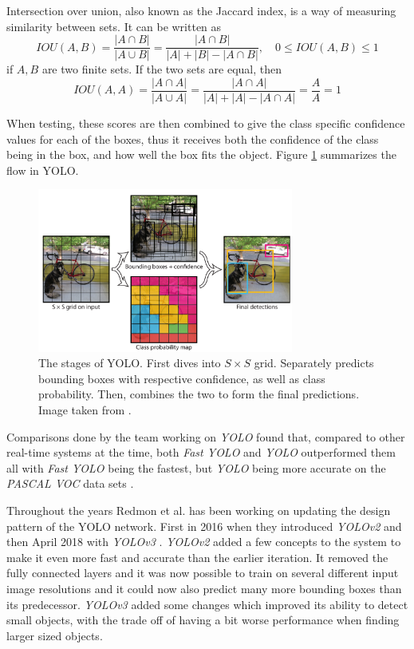  Intersection over union, also known as the Jaccard index, is a way of measuring similarity between sets. It can be written as 
 \[
IOU(A,B) =  \frac{|A\cap B |}{|A\cup B|} =\frac{|A\cap B|}{|A| + |B| - |A \cap B|}
, \quad 0\leq IOU(A,B) \leq 1
 \]
 if $A,B$ are two finite sets. If the two sets are equal, then \[ IOU(A,A) =  \frac{|A\cap A |}{|A\cup A|} = \frac{|A\cap A|}{|A| + |A| - |A \cap A|}  = \frac{A}{A} = 1 \]
 
 When testing, these scores are then combined to give the class specific confidence values for each of the boxes, thus it receives both the confidence of the class being in the box, and how well the box fits the object. Figure \ref{fig:YOLO_stages} summarizes the flow in YOLO. 
\begin{figure}[hbtp]
\begin{center}
\includegraphics[width = 0.75\textwidth]{./Images/YOLO_stages.PNG} 
\caption{The stages of YOLO. First dives into $S \times S$ grid. Separately predicts bounding boxes with respective confidence, as well as class probability. Then, combines the two to form the final predictions. Image taken from \cite{YOLO1}.}
\label{fig:YOLO_stages}
\end{center}
\end{figure}

Comparisons done by the team working on \textit{YOLO} found that, compared to other real-time systems at the time, both \textit{Fast YOLO} and \textit{YOLO} outperformed them all with \textit{Fast YOLO} being the fastest, but \textit{YOLO} being more accurate on the \textit{PASCAL VOC} data sets \cite{PASCAL}.

Throughout the years Redmon et al. has been working on updating the design pattern of the 
YOLO network. First in 2016 when they introduced \textit{YOLOv2} and then April 2018 with \textit{YOLOv3} \cite{YOLO2}\cite{YOLO3}. \textit{YOLOv2} added a few concepts to the system to make it even more fast and accurate than the earlier iteration. It removed the fully connected layers and it was now possible to train on several different input image resolutions and it could now also predict many more bounding boxes than its predecessor. \textit{YOLOv3} added some changes which improved its ability to detect small objects, with the trade off of having a bit worse performance when finding larger sized objects.  

